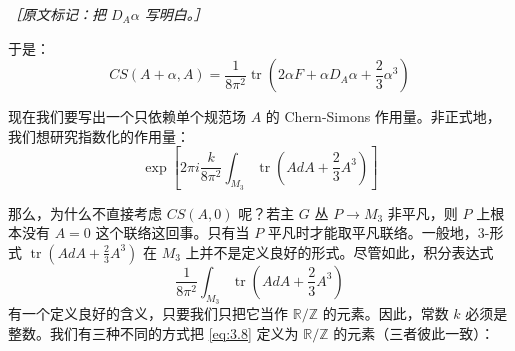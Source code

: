 {\small\itshape ［原文标记：把 $D_A\alpha$ 写明白。］}

于是：
\begin{equation}
  CS(A+\alpha,A)=\frac{1}{8\pi^2}\operatorname{tr}\left(2\alpha F+\alpha D_A\alpha+\frac23\alpha^3\right)
  \tag{3.6}
  \label{eq:3.6}
\end{equation}

现在我们要写出一个只依赖单个规范场 $A$ 的 Chern-Simons 作用量。非正式地，我们想研究指数化的作用量：
\begin{equation}
  \exp\left[2\pi i\frac{k}{8\pi^2}\int_{M_3}\operatorname{tr}\left(AdA+\frac23A^3\right)\right]
  \tag{3.7}
  \label{eq:3.7}
\end{equation}

那么，为什么不直接考虑 $CS(A,0)$ 呢？若主 $G$ 丛 $P\to M_3$ 非平凡，则 $P$ 上根本没有 $A=0$ 这个联络这回事。只有当 $P$ 平凡时才能取平凡联络。一般地，3-形式 $\operatorname{tr}(AdA+\frac23A^3)$ 在 $M_3$ 上并不是定义良好的形式。尽管如此，积分表达式
\begin{equation}
  \frac{1}{8\pi^2}\int_{M_3}\operatorname{tr}\left(AdA+\frac23A^3\right)
  \tag{3.8}
  \label{eq:3.8}
\end{equation}
有一个定义良好的含义，只要我们只把它当作 $\mathbb{R}/\mathbb{Z}$ 的元素。因此，常数 $k$ 必须是整数。我们有三种不同的方式把 \eqref{eq:3.8} 定义为 $\mathbb{R}/\mathbb{Z}$ 的元素（三者彼此一致）：

